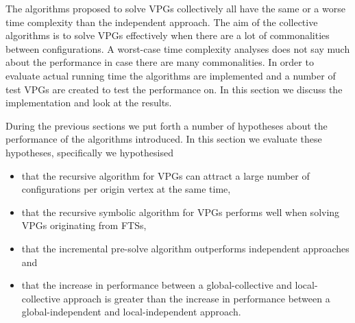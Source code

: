 The algorithms proposed to solve VPGs collectively all have the same or a worse time complexity than the independent approach. The aim of the collective algorithms is to solve VPGs effectively when there are a lot of commonalities between configurations. A worst-case time complexity analyses does not say much about the performance in case there are many commonalities. In order to evaluate actual running time the algorithms are implemented and a number of test VPGs are created to test the performance on. In this section we discuss the implementation and look at the results.

During the previous sections we put forth a number of hypotheses about the performance of the algorithms introduced. In this section we evaluate these hypotheses, specifically we hypothesised
\begin{itemize}
	\item that the recursive algorithm for VPGs can attract a large number of configurations per origin vertex at the same time,
	\item that the recursive symbolic algorithm for VPGs performs well when solving VPGs originating from FTSs,
	\item that the incremental pre-solve algorithm outperforms independent approaches and
	\item that the increase in performance between a global-collective and local-collective approach is greater than the increase in performance between a global-independent and local-independent approach.
\end{itemize}